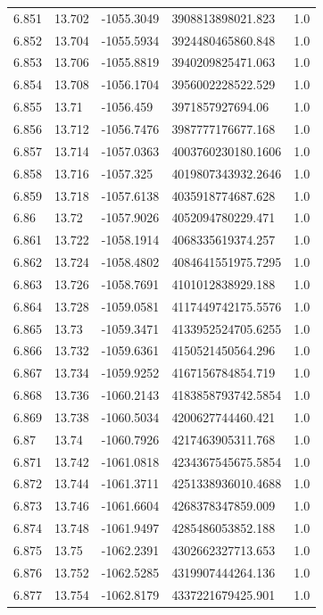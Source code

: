 \begin{tabular}{lllll}
6.851 & 13.702 & -1055.3049 & 3908813898021.823 & 1.0 \\
6.852 & 13.704 & -1055.5934 & 3924480465860.848 & 1.0 \\
6.853 & 13.706 & -1055.8819 & 3940209825471.063 & 1.0 \\
6.854 & 13.708 & -1056.1704 & 3956002228522.529 & 1.0 \\
6.855 & 13.71 & -1056.459 & 3971857927694.06 & 1.0 \\
6.856 & 13.712 & -1056.7476 & 3987777176677.168 & 1.0 \\
6.857 & 13.714 & -1057.0363 & 4003760230180.1606 & 1.0 \\
6.858 & 13.716 & -1057.325 & 4019807343932.2646 & 1.0 \\
6.859 & 13.718 & -1057.6138 & 4035918774687.628 & 1.0 \\
6.86 & 13.72 & -1057.9026 & 4052094780229.471 & 1.0 \\
6.861 & 13.722 & -1058.1914 & 4068335619374.257 & 1.0 \\
6.862 & 13.724 & -1058.4802 & 4084641551975.7295 & 1.0 \\
6.863 & 13.726 & -1058.7691 & 4101012838929.188 & 1.0 \\
6.864 & 13.728 & -1059.0581 & 4117449742175.5576 & 1.0 \\
6.865 & 13.73 & -1059.3471 & 4133952524705.6255 & 1.0 \\
6.866 & 13.732 & -1059.6361 & 4150521450564.296 & 1.0 \\
6.867 & 13.734 & -1059.9252 & 4167156784854.719 & 1.0 \\
6.868 & 13.736 & -1060.2143 & 4183858793742.5854 & 1.0 \\
6.869 & 13.738 & -1060.5034 & 4200627744460.421 & 1.0 \\
6.87 & 13.74 & -1060.7926 & 4217463905311.768 & 1.0 \\
6.871 & 13.742 & -1061.0818 & 4234367545675.5854 & 1.0 \\
6.872 & 13.744 & -1061.3711 & 4251338936010.4688 & 1.0 \\
6.873 & 13.746 & -1061.6604 & 4268378347859.009 & 1.0 \\
6.874 & 13.748 & -1061.9497 & 4285486053852.188 & 1.0 \\
6.875 & 13.75 & -1062.2391 & 4302662327713.653 & 1.0 \\
6.876 & 13.752 & -1062.5285 & 4319907444264.136 & 1.0 \\
6.877 & 13.754 & -1062.8179 & 4337221679425.901 & 1.0 \\

\end{tabular}
